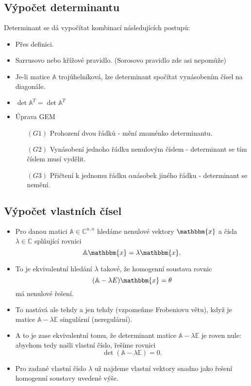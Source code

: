 \documentclass{szzclass}
\begin{document}
\subsection{Výpočet determinantu}
Determinant se dá vypočítat kombinací následujících postupů:
\begin{itemize}
\item Přes definici.
\item Sarrusovo nebo křížové pravidlo. (Sorosovo pravidlo zde asi nepomůže)
\item Je-li matice $\mathbb{A}$ trojúhelníková, lze determinant spočítat vynásobením čísel na diagonále.
\item $\det{\mathbb{A}^T}=\det{\mathbb{A}}^T$
\item Úprava GEM
  \begin{itemize}
  \item[$(G1)$] Prohození dvou řádků - mění znaménko determinantu.
  \item[$(G2)$] Vynásobení jednoho řádku nenulovým číslem - determinant se tím číslem musí vydělit.
  \item[$(G3)$] Přičtení k jednomu řádku $\alpha$násobek jiného řádku - determinant se nemění.
  \end{itemize}
\end{itemize}

\subsection{Výpočet vlastních čísel}

\begin{itemize}
\item Pro danou matici $\mathbb{A} \in \mathbb{C}^{n,n}$ hledáme nenulové vektory $\mathbbm{x}$ a čísla $\lambda\in\mathbb{C}$ splňující rovnici
\[
  \mathbb{A}\mathbbm{x} = \lambda \mathbbm{x}.
\]
\item To je ekvivalentní hledání $\lambda$ takové, že homogenní soustava rovnic
\[
  (\mathbb{A} - \lambda E)\mathbbm{x} = \theta
\]
má nenulové řešení.
\item To nastává ale tehdy a jen tehdy (vzpomeňme Frobeniovu větu), když je matice $\mathbb{A} - \lambda \mathbb{E}$ singulární (neregulární).
\item A to je zase ekvivalentní tomu, že determinant matice $\mathbb{A} - \lambda \mathbb{E}$ je roven nule: abychom tedy našli vlastní číslo, řešíme rovnici
\[
  \det(\mathbb{A} - \lambda \mathbb{E}) = 0.
\]
\item Pro zadané vlastní číslo $\lambda$ už najdeme vlastní vektory snadno jako řešení homogenní soustavy uvedené výše.
\end{itemize}
\end{document}

